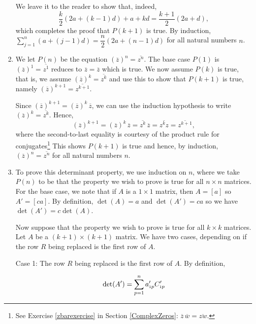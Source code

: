 \documentclass{ximera}
\begin{document}
\begin{example}
\begin{enumerate}
We leave it  to the reader to show that, indeed, \[\frac{k}{2}(2a + (k-1)d) + a + kd = \frac{k+1}{2}(2a+d),\] which completes the proof that $P(k+1)$ is true.  By induction, $\displaystyle{\sum_{j=1}^{n} (a + (j-1)d) = \dfrac{n}{2}(2a + (n-1)d)}$ for all natural numbers $n$.

\item  We let $P(n)$ be the equation $\left(\overline{z}\right)^n = \overline{z^{n}}$.  The base case $P(1)$ is $\left(\overline{z}\right)^1 = \overline{z^{1}}$ reduces to $\overline{z} = \overline{z}$ which is true.  We now assume $P(k)$ is true, that is, we assume $\left(\overline{z}\right)^k = \overline{z^{k}}$ and use this to show that $P(k+1)$ is true, namely  $\left(\overline{z}\right)^{k+1} = \overline{z^{k+1}}$.  

\smallskip

Since $\left(\overline{z}\right)^{k+1} = \left(\overline{z}\right)^{k} \, \overline{z}$, we can use the induction hypothesis to write $\left(\overline{z}\right)^k = \overline{z^{k}}$.  Hence,  \[\left(\overline{z}\right)^{k+1} = \left(\overline{z}\right)^{k} \, \overline{z} =  \overline{z^{k}} \, \overline{z} = \overline{z^{k} z} = \overline{z^{k+1}}, \]  where the second-to-last equality is courtesy of the product rule for conjugates\footnote{See Exercise \ref{zbarexercise} in Section \ref{ComplexZeros}:  $\overline{z} \, \overline{w} = \overline{zw}$.}  This shows $P(k+1)$ is true and hence, by induction, $\left(\overline{z}\right)^n = \overline{z^{n}}$ for all natural numbers $n$.

\item  To prove this determinant property, we use induction on $n$, where we take $P(n)$ to be that the property we wish to prove is true for all $n \times n$ matrices. For the base case, we note that if $A$ is a $1 \times 1$ matrix, then $A = [a]$ so $A' = [ca]$.  By definition, $\det(A) = a$ and $\det(A') = ca$ so we have $\det(A') = c \det(A)$.

\smallskip

Now suppose that the property we wish to prove is true for all $k \times k$ matrices.  Let $A$ be a $(k+1) \times (k+1)$ matrix.  We have two cases, depending on if the row $R$ being replaced is the first row of $A$.  

{ \sc Case 1: } The row $R$ being replaced is the first row of $A$. By definition,

\[ \det(A') = \displaystyle{\sum_{p=1}^{n} a'_{\mbox{\tiny$1$}p} C'_{\mbox{\tiny$1$}p}}\]


\end{enumerate}
\end{example}
\end{document}
